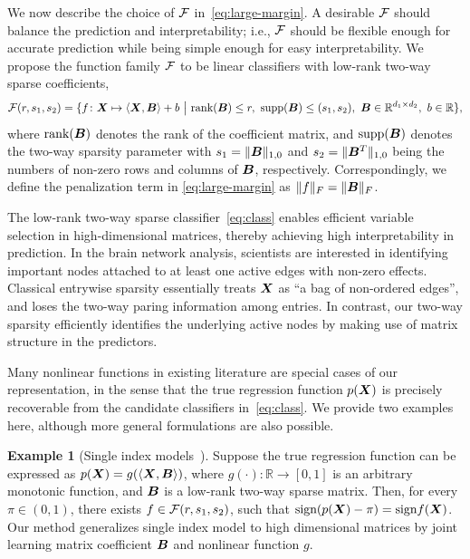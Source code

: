 \documentclass[11pt]{article}
\theoremstyle{definition}
\newtheorem{example}{Example}
\def\sign{\textup{sign}}
\begin{document}
We now describe the choice of $\mathcal{F}$ in~\eqref{eq:large-margin}. A desirable $\mathcal{F}$ should balance the prediction and interpretability; i.e., $\mathcal{F}$ should be flexible enough for accurate prediction while being simple enough for easy interpretability. We propose the function family $\mathcal{F}$ to be linear classifiers with low-rank two-way sparse coefficients,
\begin{align}\label{eq:class}
\tF(r,s_1,s_2)=\{f\colon \mX\mapsto \langle \mX, \mB \rangle +b \ \big|\ \text{rank}(\mB)\leq r, \ \text{supp}(\mB)\leq (s_1,s_2), \ \mB\in\mathbb{R}^{d_1\times d_2},\ b\in\mathbb{R}\},
\end{align}
where $\text{rank}(\bm B)$ denotes the rank of the coefficient matrix, and $\text{supp}(\bm B)$ denotes the two-way sparsity parameter with $s_1=\lVert\bm B\rVert_{1,0}$ and $s_2=\lVert\bm B^T\rVert_{1,0}$ being the numbers of non-zero rows and columns of $\bm B$, respectively. Correspondingly, we define the penalization term in \eqref{eq:large-margin} as $\lVert f\rVert_F = \lVert\bm B\rVert_F$. 

The low-rank two-way sparse classifier~\eqref{eq:class} enables efficient variable selection in high-dimensional matrices, thereby achieving high interpretability in prediction. In the brain network analysis, scientists are interested in identifying important nodes attached to at least one active edges with non-zero effects. Classical entrywise sparsity essentially treats $\bm X$ as ``a bag of non-ordered edges'', and loses the two-way paring information among entries. In contrast, our two-way sparsity efficiently identifies the underlying active nodes by making use of matrix structure in the predictors. 

Many nonlinear functions in existing literature are special cases of our representation, in the sense that the true regression function $p(\bm X)$ is precisely recoverable from the candidate classifiers in~\eqref{eq:class}. We provide two examples here, although more general formulations are also possible. 

\begin{example}[Single index models~\citep{alquier2013sparse}]\label{example:1}
Suppose the true regression function can be expressed as $p(\bm X)= g(\langle \bm X,\bm B\rangle)$, where $g(\cdot)\colon \mathbb{R}\to [0,1]$ is an arbitrary monotonic function, and $\bm B$ is a low-rank two-way sparse matrix. Then, for every $\pi\in(0,1)$, there exists $f\in \mathcal{F}(r,s_1,s_2)$, such that $\sign(p(\mX)-\pi)= \sign f(\mX)$. Our method generalizes single index model to high dimensional matrices by joint learning matrix coefficient $\bm B$ and nonlinear function $g$. 
\end{example}
\end{document}
